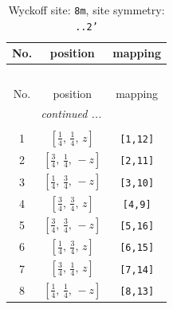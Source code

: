 \documentclass[fleqn,8pt]{jsarticle}
\begin{document}
\renewcommand{\arraystretch}{1.2}
\begin{longtable}{ccc}
\caption{Wyckoff site: {\tt 8m}, site symmetry: {\tt ..2'}}
 \\
 \hline \hline
No. & position & mapping \\ \hline \endfirsthead

\multicolumn{2}{l}{\tablename\ \thetable{}} \\
 \hline \hline
No. & position & mapping \\ \hline \endhead

 \hline \hline
\multicolumn{2}{r}{\footnotesize\it continued ...} \\ \endfoot

 \hline \hline
\multicolumn{2}{r}{} \\ \endlastfoot

1 & $\left[ \frac{1}{4},\, \frac{1}{4},\, z \right]$ & {\tt [1,12]} \\ \hline
2 & $\left[ \frac{3}{4},\, \frac{1}{4},\, - z \right]$ & {\tt [2,11]} \\ \hline
3 & $\left[ \frac{1}{4},\, \frac{3}{4},\, - z \right]$ & {\tt [3,10]} \\ \hline
4 & $\left[ \frac{3}{4},\, \frac{3}{4},\, z \right]$ & {\tt [4,9]} \\ \hline
5 & $\left[ \frac{3}{4},\, \frac{3}{4},\, - z \right]$ & {\tt [5,16]} \\ \hline
6 & $\left[ \frac{1}{4},\, \frac{3}{4},\, z \right]$ & {\tt [6,15]} \\ \hline
7 & $\left[ \frac{3}{4},\, \frac{1}{4},\, z \right]$ & {\tt [7,14]} \\ \hline
8 & $\left[ \frac{1}{4},\, \frac{1}{4},\, - z \right]$ & {\tt [8,13]} \\
\end{longtable}
\renewcommand{\arraystretch}{1.2}
\end{document}

